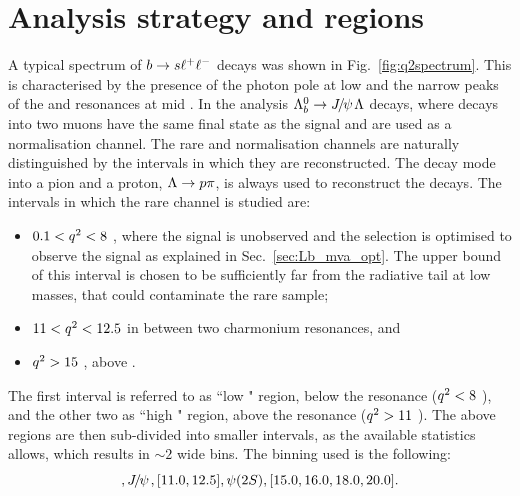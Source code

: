\section{Analysis strategy and \qsq regions}
\label{sec:Lb_q2choice}

A typical \qsq spectrum of ${b}\rightarrow{\ensuremath{s}}\ell^+ \ell^-$ decays was shown in Fig.~\ref{fig:q2spectrum}.
This is characterised by the presence of the photon pole at low \qsq and the narrow peaks of the \jpsi and \psitwos 
resonances at mid \qsq. In the analysis $\Lb\to\jpsi\Lz$ decays, where \jpsi decays into two muons have the same final
state as the signal and are used as a normalisation channel. The rare and normalisation channels are naturally
distinguished by the \qsq intervals in which they are reconstructed. 
The \Lz decay mode into a pion and a proton, $\Lz\to p\pi$, is always used to reconstruct the decays. 
The intervals in which the rare channel is studied are:
\begin{itemize}
\item $0.1 < {q^2} < 8$ \gevgevcccc, where the signal is unobserved and the selection 
is optimised to observe the signal as explained in Sec.~\ref{sec:Lb_mva_opt}.
The upper bound of this interval is chosen to be sufficiently far from the \jpsi radiative tail at low masses, that
could contaminate the rare sample;
\item $11 < {q^2} < 12.5$ \gevgevcccc in between two charmonium resonances, and 
\item ${q^2}>15$ \gevgevcccc, above \psitwos.
\end{itemize}
The first interval is referred to as ``low \qsq" region, below the \jpsi resonance (${q^2} < 8$ \gevgevcccc),
and the other two as ``high \qsq" region, above the \jpsi resonance (${q^2} > 11$ \gevgevcccc).
The above regions are then sub-divided into smaller intervals, as the available 
statistics allows, which results in $\sim 2$ \gevgevcccc wide bins. The binning used is the following:
\begin{equation}
[0.1, 2.0, 4.0, 6.0, 8.0], \jpsi, [11.0, 12.5], \psitwos, [15.0, 16.0, 18.0, 20.0].
\end{equation}

